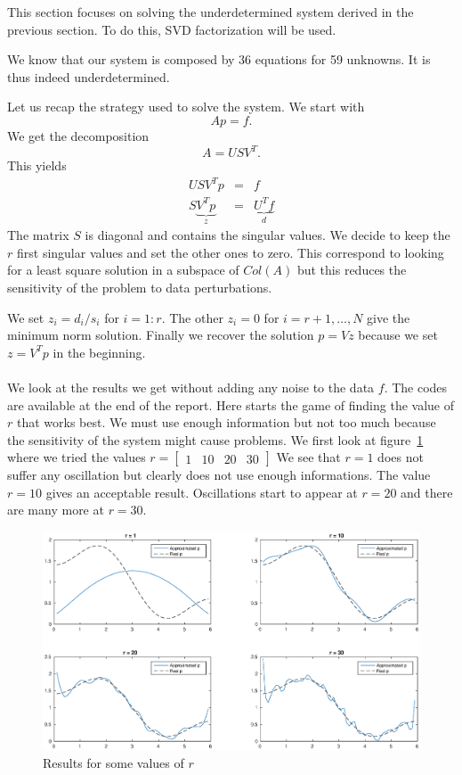 This section focuses on solving the underdetermined system derived in the previous section. To do this, SVD factorization will be used. 

We know that our system is composed by 36 equations for 59 unknowns. It is thus indeed underdetermined. 

Let us recap the strategy used to solve the system. We start with $$Ap=f.$$
We get the decomposition $$A = USV^{T}.$$
This yields
\begin{eqnarray}
USV^{T}p & = & f\\
S\underbrace{V^{T }p}_{z} & = & \underbrace{U^{T}f}_{d}
\end{eqnarray}
The matrix $S$ is diagonal and contains the singular values. We decide to keep the $r$ first singular values and set the other ones to zero. This correspond to looking for a least square solution in a subspace of $Col(A)$ but this reduces the sensitivity of the problem to data perturbations.


We set $z_{i}= d_{i}/s_{i}$ for $i = 1:r$. The other $z_{i}=0$ for $i = r+1,\dots,N$ give the minimum norm solution. Finally we recover the solution $p=Vz$ because we set $z=V^{T}p$ in the beginning.

\paragraph*{}
We look at the results we get without adding any noise to the data $f$. The codes are available at the end of the report. Here starts the game of finding the value of $r$ that works best. We must use enough information but not too much because the sensitivity of the system might cause problems. We first look at figure~\ref{fig:nn0} where we tried the values $r= \begin{bmatrix}
1 & 10 & 20 & 30 
\end{bmatrix}$
We see that $r=1$ does not suffer any oscillation but clearly does not use enough informations. The value $r=10$ gives an acceptable result. Oscillations start to appear at $r=20$ and there are many more at $r=30$.
\begin{figure}[!h]
\centering
\includegraphics[scale = 0.5]{./nn0.eps}
\caption{Results for some values of $r$}
\label{fig:nn0}
\end{figure}

